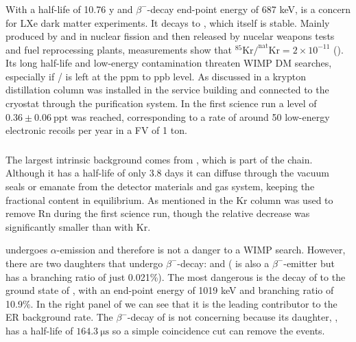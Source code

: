 \subsubsection{}
\label{subsubsec:backgrounds_electronic_krypton}
With a half-life of 10.76 y and $\beta^-$-decay end-point energy of 687 keV,  is a concern for LXe dark matter
experiments.  It decays to , which itself is stable.  Mainly
produced by  and  in nuclear fission and then released by nucelar weapons tests and fuel reprocessing plants,
measurements show that $\mathrm{^{85}Kr / ^{nat}Kr} = 2 \times 10^{-11}$ ().  Its long half-life and low-energy
contamination threaten WIMP DM searches, especially if / is left at the ppm to ppb level.  As discussed in
 a krypton distillation column was installed in the service building and connected to the cryostat through
the purification system.  In the first science run a level of $0.36 \pm 0.06\ \mathrm{ppt}$ was reached, corresponding to a rate of
around 50 low-energy electronic recoils per year in a FV of 1 ton.

\subsubsection{}
\label{subsubsec:backgrounds_electronic_radon}
The largest intrinsic background comes from , which is part of the  chain.  Although it has a half-life of only
3.8 days it can diffuse through the vacuum seals or emanate from the detector materials and gas system, keeping the fractional content in
equilibrium.  As mentioned in  the Kr column was used to remove Rn during the first science run, though the
relative decrease was significantly smaller than with Kr.

 undergoes $\alpha$-emission and therefore is not a danger to a WIMP search.  However, there are two daughters that undergo
$\beta^-$-decay:  and  ( is also a $\beta^-$-emitter but has a branching ratio of just
0.021\%).  The most dangerous is the decay of  to the ground state of , with an end-point energy of 1019 keV and
branching ratio of 10.9\%.  In the right panel of  we can see that it is the leading contributor to
the ER
background rate.  The $\beta^-$-decay of  is not concerning because its daughter, , has a half-life of
$164.3\ \mathrm{\mu s}$ so a simple coincidence cut can remove the events.


